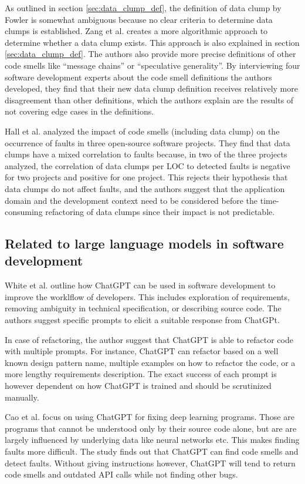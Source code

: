 As outlined in section \ref{sec:data_clump_def}, the definition of data clump by Fowler \cite{fowler2019refactoring} is somewhat ambiguous because no clear criteria to determine data clumps is established. Zang et al. \cite{zhangImprovingPrecisionFowler2008} creates a more algorithmic approach to determine whether a data clump exists. This approach is also explained in section \ref{sec:data_clump_def}. The authors also provide more precise definitions of other code smells like \enquote{message chains} or \enquote{speculative generality}. By interviewing four software development experts about the code smell definitions the authors developed, they find that their new data clump definition receives relatively more disagreement than other definitions, which the authors explain are the results of not covering edge cases in the definitions. 


Hall et al. analyzed the impact of code smells (including data clump) on the occurrence of faults in three open-source software projects. They find that data clumps have a mixed correlation to faults because, in two of the three projects analyzed, the correlation of data clumps per \ac{LOC} to detected faults is negative for two projects and positive for one project. This rejects their hypothesis that data clumps do not affect faults, and the authors suggest that the application domain and the development context need to be considered before the time-consuming refactoring of data clumps since their impact is not predictable.  \cite{hallCodeSmellsHave2014}

\subsection{Related to large language models in software development}

White et al. \cite{White2023ChatGPTPP} outline how ChatGPT can be used in software development to improve the worklflow of developers. This includes  exploration of requirements, removing ambiguity in technical specification, or describing source code. The authors suggest specific prompts to elicit a suitable response from ChatGPt.

In case of refactoring, the author suggest that ChatGPT is able to refactor code with multiple prompts. For instance, ChatGPT can refactor based on a well known design pattern name, multiple examples on how to refactor the code, or a more lengthy requirements description. The exact success of each prompt is however dependent on how ChatGPT is trained and should be scrutinized manually. 

Cao et al. \cite{cao2023study} focus on using ChatGPT for fixing deep learning programs. Those are programs that cannot be understood only by their source code alone, but are are largely influenced by underlying data like  neural networks etc. This makes finding faults more difficult. The study finds out that ChatGPT can find code smells and detect faults. Without giving instructions however, ChatGPT will tend to return code smells and outdated API calls while not finding other bugs. 



